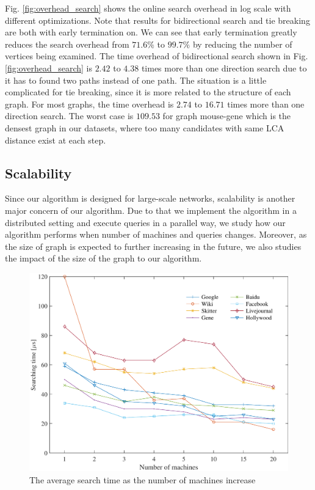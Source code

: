 Fig. \ref{fig:overhead_search} shows the online search overhead in log scale with different optimizations. Note that results for bidirectional search and tie breaking are both with early termination on. We can see that early termination greatly reduces the search overhead from $71.6\%$ to $99.7\%$ by reducing the number of vertices being examined. The time overhead of bidirectional search shown in Fig. \ref{fig:overhead_search} is $2.42$ to $4.38$ times more than one direction search due to it has to found two paths instead of one path. The situation is a little complicated for tie breaking, since it is more related to the structure of each graph. For most graphs, the time overhead is $2.74$ to $16.71$ times more than one direction search. The worst case is $109.53$ for graph mouse-gene which is the densest graph in our datasets, where too many candidates with same LCA distance exist at each step.

\subsection{Scalability}
\label{eval_scalability}

Since our algorithm is designed for large-scale networks, scalability is another major concern of our algorithm. Due to that we implement the algorithm in a distributed setting and execute queries in a parallel way, we study how our algorithm performs when number of machines and queries changes. Moreover, as the size of graph is expected to further increasing in the future, we also studies the impact of the size of the graph to our algorithm.

\begin{figure}[t]
    \centering
    \includegraphics[width=\linewidth]{./figures/scale_machine.pdf}
    \caption{The average search time as the number of machines increase}
    \label{fig:scale_machine}
\end{figure}

